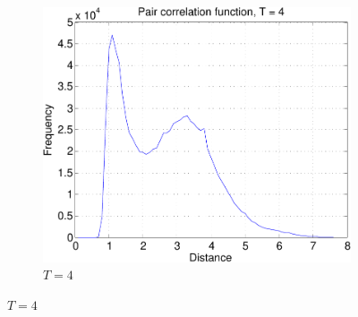 \documentclass[10pt,a4paper]{article}
\begin{document}
\begin{figure}[ht!]
 \begin{subfigure}[b]{0.3\linewidth}
  \includegraphics[width=\textwidth]{figs/pair_corr_Teq4-crop.pdf}
  \caption{$T=4$}
  \label{fig:pcorr4}
 \end{subfigure}
 

\end{figure}
\end{document}
